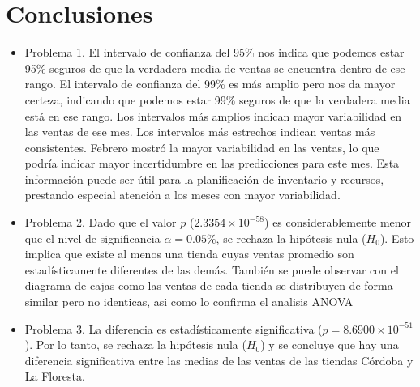 
\section{Conclusiones}

\begin{itemize}
    \item Problema 1. 
    \subitem El intervalo de confianza del 95\% nos indica que podemos estar 95\% seguros de que la verdadera media de ventas se encuentra dentro de ese rango. El intervalo de confianza del 99\% es más amplio pero nos da mayor certeza, indicando que podemos estar 99\% seguros de que la verdadera media está en ese rango.
    \subitem Los intervalos más amplios indican mayor variabilidad en las ventas de ese mes. Los intervalos más estrechos indican ventas más consistentes. 
    \subitem Febrero mostró la mayor variabilidad en las ventas, lo que podría indicar mayor incertidumbre en las predicciones para este mes.
    \subitem Esta información puede ser útil para la planificación de inventario y recursos, prestando especial atención a los meses con mayor variabilidad.
    \item Problema 2. 
    \subitem Dado que el valor $p$ ($2.3354 \times 10^{-58}$) es considerablemente menor que el nivel de significancia $\alpha = 0.05\%$, se rechaza la hip\'otesis nula ($H_0$). Esto implica que existe al menos una tienda cuyas ventas promedio son estad\'isticamente diferentes de las dem\'as.
    \subitem Tambi\'en se puede observar con el diagrama de cajas como las ventas de cada tienda se distribuyen de forma similar pero no identicas, asi como lo confirma el analisis ANOVA
    \item Problema 3. 
    \subitem La diferencia es estad\'isticamente significativa ($p = 8.6900 \times 10^{-51}$). Por lo tanto, se rechaza la hip\'otesis nula ($H_0$) y se concluye que hay una diferencia significativa entre las medias de las ventas de las tiendas C\'ordoba y La Floresta.
\end{itemize}

